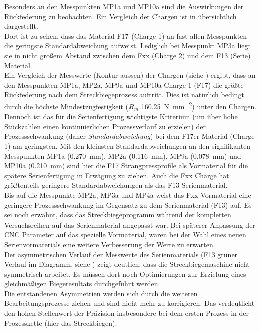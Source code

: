 \documentclass[12pt,a4paper,parskip,twoside,BCOR5mm,headsepline]{scrartcl}
\begin{document}
 Besonders an den Messpunkten MP1a und MP10a sind die Auswirkungen der Rückfederung zu beobachten. Ein Vergleich der Chargen ist in  übersichtlich dargestellt. \\Dort ist zu sehen, dass das Material F17 (Charge 1) an fast allen Messpunkten die geringste Standardabweichung aufweist. Lediglich bei Messpunkt MP3a liegt sie in nicht großem Abstand zwischen dem Fxx (Charge 2) und dem F13 (Serie) Material.\\Ein Vergleich der Messwerte (Kontur aussen) der Chargen (siehe  ) ergibt, dass an den Messpunkten MP1a, MP2a, MP9a und MP10a  Charge 1 (F17) die größte Rückfederung nach dem Streckbiegeprozess auftritt. Dies ist natürlich bedingt durch die höchste Mindestzugfestigkeit ($R_m$ \SI{160,25}{\newton\per\milli\meter\squared}) unter den Chargen.\\
 Dennoch ist das für die Serienfertigung wichtigste Kriterium (um über hohe Stückzahlen einen kontinuierlichen Prozessverlauf zu erzielen) der Prozessschwankung (daher \emph{Standardabweichung}) bei dem F17er Material (Charge 1) am geringsten. Mit den kleinsten Standardabweichungen an den signifikanten Messpunkten MP1a (\SI{0,270}{\milli\meter}),  MP2a (\SI{0,116}{\milli\meter}),  MP9a (\SI{0,078}{\milli\meter}) und MP10a (\SI{0,210}{\milli\meter}) sind hier die F17 Strangpressprofile als Vormaterial für die spätere Serienfertigung in Erwägung zu ziehen. Auch die Fxx Charge hat größtenteils geringere Standardabweichungen als das F13 Serienmaterial.\\ Bis auf die Messpunkte MP2a, MP3a und MP4a  weist das Fxx Vormaterial eine geringere Prozessschwankung im Gegensatz zu dem Serienmaterial (F13) auf. Es sei noch erwähnt, dass das Streckbiegeprogramm während der kompletten Versuchsreihen auf das Serienmaterial angepasst war. Bei späterer Anpassung der CNC Parameter auf das spezielle Vormaterial,  wären bei der Wahl eines neuen Serienvormaterials eine weitere Verbesserung der Werte zu erwarten.\\ Der asymmetrischen Verlauf der Messwerte des Serienmaterials (F13 grüner Verlauf im Diagramm,   siehe ) zeigt deutlich, dass die Streckbiegemaschine nicht symmetrisch arbeitet. Es müssen dort noch Optimierungen zur Erzielung eines gleichmäßigen Biegeresultats durchgeführt werden.\\
 Die entstandenen Asymmetrien werden sich durch die weiteren Bearbeitungsprozesse ziehen und sind nicht mehr zu korrigieren. Das verdeutlicht den hohen Stellenwert der Präzision insbesondere bei dem ersten Prozess in der Prozesskette (hier das Streckbiegen).
  
\end{document}
